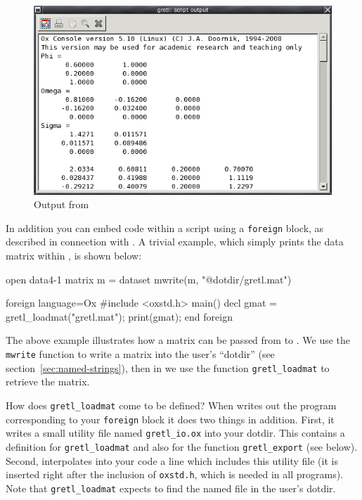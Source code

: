 \begin{figure}[htbp]
  \centering
  \includegraphics[scale=0.7]{figures/Oxout}
  \caption{Output from }
  \label{fig:Oxout}
\end{figure}

In addition you can embed  code within a  script
using a \texttt{foreign} block, as described in connection with
.  A trivial example, which simply prints the  data
matrix within , is shown below:
%
\begin{code}
open data4-1
matrix m = { dataset }
mwrite(m, "@dotdir/gretl.mat")

foreign language=Ox 
#include <oxstd.h>
main()
{
   decl gmat = gretl_loadmat("gretl.mat");
   print(gmat);
}
end foreign
\end{code}

The above example illustrates how a matrix can be passed from
 to .  We use the \texttt{mwrite} function to write
a matrix into the user's ``dotdir'' (see
section~\ref{sec:named-strings}), then in  we use the function
\verb|gretl_loadmat| to retrieve the matrix.

How does \verb|gretl_loadmat| come to be defined?  When 
writes out the  program corresponding to your \texttt{foreign}
block it does two things in addition.  First, it writes a small
utility file named \verb|gretl_io.ox| into your dotdir.  This contains
a definition for \verb|gretl_loadmat| and also for the function
\verb|gretl_export| (see below).  Second,  interpolates
into your  code a line which includes this utility file (it is
inserted right after the inclusion of \texttt{oxstd.h}, which is
needed in all  programs).  Note that \verb|gretl_loadmat|
expects to find the named file in the user's dotdir.

